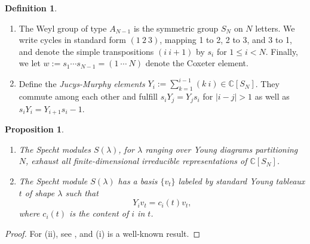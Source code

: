 \documentclass[11pt]{report}
\newtheorem{prop}[theorem]{Proposition}
\theoremstyle{definition}
\newtheorem{definition}[theorem]{Definition}
\theoremstyle{remark}
\theoremstyle{remark}
\newcommand{\C}{\mathbb{C}}
\begin{document}
\begin{definition}
\begin{enumerate}[label=(\roman*)]
\item The Weyl group of type $A_{N-1}$ is the symmetric group $S_N$ on $N$ letters. We write cycles in standard form $(1 \ 2 \ 3)$, mapping 1 to 2, 2 to 3, and 3 to 1, and denote the simple transpositions $(i \ i+1)$ by $s_i$ for $1 \leq i < N$. Finally, we let $w := s_1 \cdots s_{N-1} = (1 \ \cdots \ N)$ denote the Coxeter element.
\item Define the \emph{Jucys-Murphy elements} $Y_i := \sum_{k=1}^{i-1} (k \ i) \in \C[S_N]$. They commute among each other and fulfill $s_i Y_j = Y_j s_i$ for $|i-j|>1$ as well as $s_i Y_i = Y_{i+1} s_i-1$.
\end{enumerate}
\end{definition}

\begin{prop}
\begin{enumerate}[label=(\roman*)]
\item The Specht modules $S(\lambda)$, for $\lambda$ ranging over Young diagrams partitioning $N$, exhaust all finite-dimensional irreducible representations of $\C[S_N]$.
\item The Specht module $S(\lambda)$ has a basis $\{ v_t \}$ labeled by standard Young tableaux $t$ of shape $\lambda$ such that
\begin{equation*}
Y_i v_t = c_i(t) v_t,
\end{equation*}
where $c_i(t)$ is the content of $i$ in $t$.
\end{enumerate}
\end{prop}

\begin{proof}
For (ii), see \cite{article:murphy:1981}, and (i) is a well-known result.
\end{proof}
\end{document}

